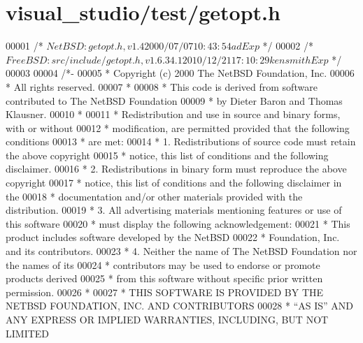 \hypertarget{visual__studio_2test_2getopt_8h_source}{}\section{visual\+\_\+studio/test/getopt.h}
\label{visual__studio_2test_2getopt_8h_source}

\begin{DoxyCode}
00001 \textcolor{comment}{/*  $NetBSD: getopt.h,v 1.4 2000/07/07 10:43:54 ad Exp $    */}
00002 \textcolor{comment}{/*  $FreeBSD: src/include/getopt.h,v 1.6.34.1 2010/12/21 17:10:29 kensmith Exp $ */}
00003 
00004 \textcolor{comment}{/*-}
00005 \textcolor{comment}{ * Copyright (c) 2000 The NetBSD Foundation, Inc.}
00006 \textcolor{comment}{ * All rights reserved.}
00007 \textcolor{comment}{ *}
00008 \textcolor{comment}{ * This code is derived from software contributed to The NetBSD Foundation}
00009 \textcolor{comment}{ * by Dieter Baron and Thomas Klausner.}
00010 \textcolor{comment}{ *}
00011 \textcolor{comment}{ * Redistribution and use in source and binary forms, with or without}
00012 \textcolor{comment}{ * modification, are permitted provided that the following conditions}
00013 \textcolor{comment}{ * are met:}
00014 \textcolor{comment}{ * 1. Redistributions of source code must retain the above copyright}
00015 \textcolor{comment}{ *    notice, this list of conditions and the following disclaimer.}
00016 \textcolor{comment}{ * 2. Redistributions in binary form must reproduce the above copyright}
00017 \textcolor{comment}{ *    notice, this list of conditions and the following disclaimer in the}
00018 \textcolor{comment}{ *    documentation and/or other materials provided with the distribution.}
00019 \textcolor{comment}{ * 3. All advertising materials mentioning features or use of this software}
00020 \textcolor{comment}{ *    must display the following acknowledgement:}
00021 \textcolor{comment}{ *        This product includes software developed by the NetBSD}
00022 \textcolor{comment}{ *        Foundation, Inc. and its contributors.}
00023 \textcolor{comment}{ * 4. Neither the name of The NetBSD Foundation nor the names of its}
00024 \textcolor{comment}{ *    contributors may be used to endorse or promote products derived}
00025 \textcolor{comment}{ *    from this software without specific prior written permission.}
00026 \textcolor{comment}{ *}
00027 \textcolor{comment}{ * THIS SOFTWARE IS PROVIDED BY THE NETBSD FOUNDATION, INC. AND CONTRIBUTORS}
00028 \textcolor{comment}{ * ``AS IS'' AND ANY EXPRESS OR IMPLIED WARRANTIES, INCLUDING, BUT NOT LIMITED}

\end{DoxyCode}
